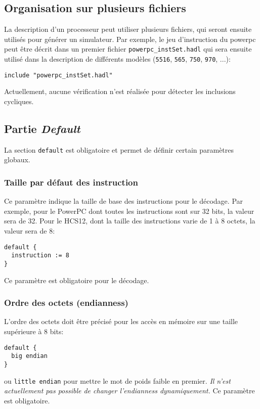 \subsection{Organisation sur plusieurs fichiers}
\label{sec:plusieursFichiers}
La description d'un processeur peut utiliser plusieurs fichiers, qui seront ensuite utilisés pour générer un simulateur. Par exemple, le jeu d'instruction du powerpc peut être décrit dans un premier fichier \texttt{powerpc\_instSet.hadl} qui sera ensuite utilisé dans la description de différents modèles (\texttt{5516}, \texttt{565}, \texttt{750}, \texttt{970}, ...):
\begin{lstlisting}
include "powerpc_instSet.hadl"
\end{lstlisting}
Actuellement, aucune vérification n'est réalisée pour détecter les inclusions cycliques.

\subsection{Partie \emph{Default}}
\label{sec:default}
La section \texttt{default} est obligatoire et permet de définir certain paramètres globaux.
\subsubsection{Taille par défaut des instruction}
Ce paramètre indique la taille de base des instructions pour le décodage. Par exemple, pour le PowerPC dont toutes les instructions sont sur 32 bits, la valeur sera de 32. Pour le HCS12, dont la taille des instructions varie de 1 à 8 octets, la valeur sera de 8:
\begin{lstlisting}
default {
  instruction := 8
}
\end{lstlisting}
Ce paramètre est obligatoire pour le décodage.
\subsubsection{Ordre des octets (endianness)}
L'ordre des octets doit être précisé pour les accès en mémoire sur une taille supérieure à 8 bits:
\begin{lstlisting}
default {
  big endian
}
\end{lstlisting}
ou \texttt{little endian} pour mettre le mot de poids faible en premier.
\emph{Il n'est actuellement pas possible de changer l'endianness dynamiquement.}
Ce paramètre est obligatoire.

